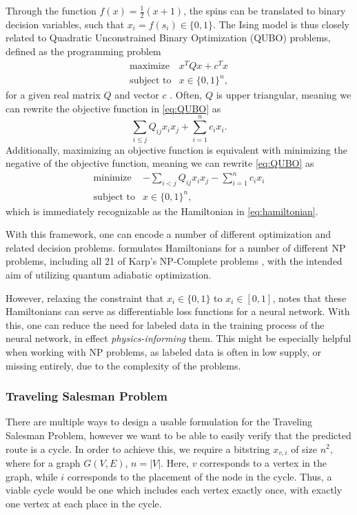 Through the function $f(x) = \frac{1}{2}(x+1)$, the spins can be translated to binary decision variables, such that $x_i = f(s_i) \in \{0, 1\}$.
The Ising model is thus closely related to Quadratic Unconstrained Binary Optimization (QUBO) problems, defined as the programming problem
\begin{equation}\label{eq:QUBO}
\begin{array}{rl}
    \text{maximize} & x^T Q x + c^T x \\
    \text{subject to} & x \in \{0, 1\}^n,
\end{array}
\end{equation}
for a given real matrix $Q$ and vector $c$ \cite[p.~1--7]{PunnenAbrahamP2022TQUB}.
Often, $Q$ is upper triangular, meaning we can rewrite the objective function in \eqref{eq:QUBO} as
\begin{equation}
    \sum_{i \leq j} Q_{ij} x_i x_j + \sum_{i = 1}^n c_i x_i.
\end{equation}
Additionally, maximizing an objective function is equivalent with minimizing the negative of the objective function, meaning we can rewrite \eqref{eq:QUBO} as
\begin{equation}
\begin{array}{rl}
    \text{minimize} & \displaystyle -\sum_{i < j} Q_{ij} x_i x_j - \sum_{i = 1}^n c_i x_i \\
    \text{subject to} & x \in \{0, 1\}^n,
\end{array}
\end{equation}
which is immediately recognizable as the Hamiltonian in \eqref{eq:hamiltonian}.

With this framework, one can encode a number of different optimization and related decision problems.
\textcite{IsingFormulations} formulates Hamiltonians for a number of different NP problems, including all 21 of Karp's NP-Complete problems \cite{Karp2010}, with the intended aim of utilizing quantum adiabatic optimization.

However, relaxing the constraint that $x_i \in \{0, 1\}$ to $x_i \in [0, 1]$, \textcite{Schuetz_2022} notes that these Hamiltonians can serve as differentiable loss functions for a neural network.
With this, one can reduce the need for labeled data in the training process of the neural network, in effect \textit{physics-informing} them.
This might be especially helpful when working with NP problems, as labeled data is often in low supply, or missing entirely, due to the complexity of the problems.

\subsubsection{Traveling Salesman Problem}
There are multiple ways to design a usable formulation for the Traveling Salesman Problem, however we want to be able to easily verify that the predicted route is a cycle.
In order to achieve this, we require a bitstring $x_{v,i}$ of size $n^2$, where for a graph $G(V, E)$, $n = |V|$.
Here, $v$ corresponds to a vertex in the graph, while $i$ corresponds to the placement of the node in the cycle.
Thus, a viable cycle would be one which includes each vertex exactly once, with exactly one vertex at each place in the cycle.

